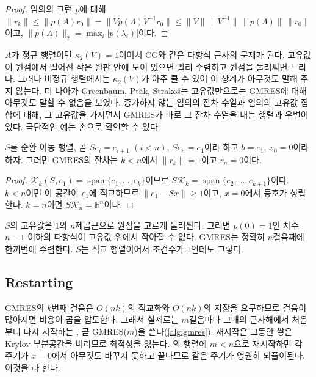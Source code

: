 \begin{proof}
임의의 그런 $p$에 대해 $\|r_k\|\le\|p(A)r_0\|=\|Vp(\Lambda)V^{-1}r_0\|\le\|V\|\,\|V^{-1}\|\,\|p(\Lambda)\|\,\|r_0\|$이고, $\|p(\Lambda)\|_2=\max_i|p(\lambda_i)|$이다.
\end{proof}

$A$가 정규 행렬이면 $\kappa_2(V)=1$이어서 CG와 같은 다항식 근사의 문제가 된다. 고유값이 원점에서 떨어진 작은 원판 안에 모여 있으면 빨리 수렴하고 원점을 둘러싸면 느리다. 그러나 비정규 행렬에서는 $\kappa_2(V)$가 아주 클 수 있어 이 상계가 아무것도 말해 주지 않는다. 더 나아가 Greenbaum, Pták, Strakoš는 고유값만으로는 GMRES에 대해 아무것도 말할 수 없음을 보였다. 증가하지 않는 임의의 잔차 수열과 임의의 고유값 집합에 대해, 그 고유값을 가지면서 GMRES가 바로 그 잔차 수열을 내는 행렬과 우변이 있다\cite{greenbaum1996any}. 극단적인 예는 손으로 확인할 수 있다.

\begin{proposition}
\label{prop:gmres-shift}
$S$를 순환 이동 행렬, 곧 $Se_i=e_{i+1}$ $(i<n)$, $Se_n=e_1$이라 하고 $b=e_1$, $x_0=0$이라 하자. 그러면 GMRES의 잔차는 $k<n$에서 $\|r_k\|=1$이고 $r_n=0$이다.
\end{proposition}

\begin{proof}
$\mathcal K_k(S,e_1)=\operatorname{span}\{e_1,\dots,e_k\}$이므로 $S\mathcal K_k=\operatorname{span}\{e_2,\dots,e_{k+1}\}$이다. $k<n$이면 이 공간이 $e_1$에 직교하므로 $\|e_1-Sx\|\ge1$이고, $x=0$에서 등호가 성립한다. $k=n$이면 $S\mathcal K_n=\mathbb R^n$이다.
\end{proof}

$S$의 고유값은 $1$의 $n$제곱근으로 원점을 고르게 둘러싼다. 그러면 $p(0)=1$인 차수 $n-1$ 이하의 다항식이 고유값 위에서 작아질 수 없다. GMRES는 정확히 $n$걸음째에 한꺼번에 수렴한다. $S$는 직교 행렬이어서 조건수가 $1$인데도 그렇다.

\subsection{Restarting}

GMRES의 $k$번째 걸음은 $O(nk)$의 직교화와 $O(nk)$의 저장을 요구하므로 걸음이 많아지면 비용이 곱을 압도한다. 그래서 실제로는 $m$걸음마다 그때의 근사해에서 처음부터 다시 시작하는 , 곧 GMRES($m$)을 쓴다(\cref{alg:gmres}). 재시작은 그동안 쌓은 Krylov 부분공간을 버리므로 최적성을 잃는다. 의 행렬에 $m<n$으로 재시작하면 각 주기가 $x=0$에서 아무것도 바꾸지 못하고 끝나므로 같은 주기가 영원히 되풀이된다. 이것을 라 한다.

